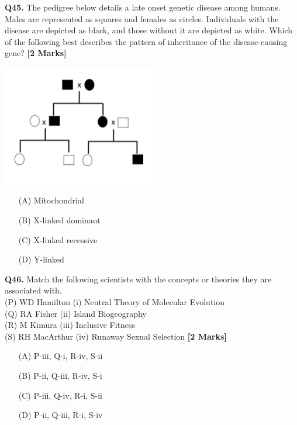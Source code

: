 \documentclass[11pt]{article}
\newcommand{\questionb}[2]{
    \noindent\textbf{Q#2.} #1 \hfill \textbf{[2 Marks]}
}
\begin{document}
\questionb{The pedigree below details a late onset genetic disease among humans. Males are represented as squares and females as circles. Individuals with the disease are depicted as black, and those without it are depicted as white. Which of the following best describes the pattern of inheritance of the disease-causing gene?}{45}
\begin{center}
\includegraphics[width=0.5\textwidth]{figures/45}
\end{center}
\begin{enumerate}
    \item[(A)] Mitochondrial
    \item[(B)] X-linked dominant
    \item[(C)] X-linked recessive
    \item[(D)] Y-linked
\end{enumerate}
\vspace{0.5cm}

\questionb{Match the following scientists with the concepts or theories they are associated with.\\
(P) WD Hamilton \hspace{0.5cm} (i) Neutral Theory of Molecular Evolution\\
(Q) RA Fisher \hspace{1.15cm} (ii) Island Biogeography\\
(R) M Kimura \hspace{1.15cm} (iii) Inclusive Fitness\\
(S) RH MacArthur \hspace{0.5cm} (iv) Runaway Sexual Selection}{46}
\begin{enumerate}
    \item[(A)] P-iii, Q-i, R-iv, S-ii
    \item[(B)] P-ii, Q-iii, R-iv, S-i
    \item[(C)] P-iii, Q-iv, R-i, S-ii
    \item[(D)] P-ii, Q-iii, R-i, S-iv
\end{enumerate}
\vspace{0.5cm}
\end{document}
